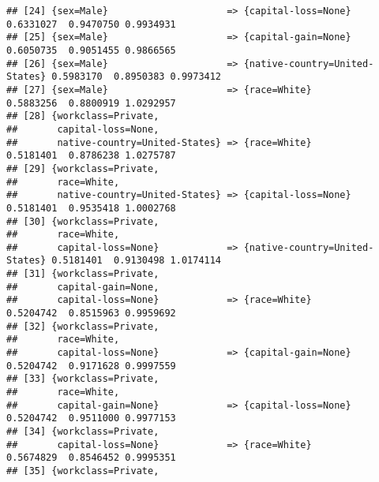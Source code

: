 \documentclass[]{article}
\begin{document}
\begin{verbatim}
## [24] {sex=Male}                     => {capital-loss=None}            0.6331027  0.9470750 0.9934931
## [25] {sex=Male}                     => {capital-gain=None}            0.6050735  0.9051455 0.9866565
## [26] {sex=Male}                     => {native-country=United-States} 0.5983170  0.8950383 0.9973412
## [27] {sex=Male}                     => {race=White}                   0.5883256  0.8800919 1.0292957
## [28] {workclass=Private,                                                                            
##       capital-loss=None,                                                                            
##       native-country=United-States} => {race=White}                   0.5181401  0.8786238 1.0275787
## [29] {workclass=Private,                                                                            
##       race=White,                                                                                   
##       native-country=United-States} => {capital-loss=None}            0.5181401  0.9535418 1.0002768
## [30] {workclass=Private,                                                                            
##       race=White,                                                                                   
##       capital-loss=None}            => {native-country=United-States} 0.5181401  0.9130498 1.0174114
## [31] {workclass=Private,                                                                            
##       capital-gain=None,                                                                            
##       capital-loss=None}            => {race=White}                   0.5204742  0.8515963 0.9959692
## [32] {workclass=Private,                                                                            
##       race=White,                                                                                   
##       capital-loss=None}            => {capital-gain=None}            0.5204742  0.9171628 0.9997559
## [33] {workclass=Private,                                                                            
##       race=White,                                                                                   
##       capital-gain=None}            => {capital-loss=None}            0.5204742  0.9511000 0.9977153
## [34] {workclass=Private,                                                                            
##       capital-loss=None}            => {race=White}                   0.5674829  0.8546452 0.9995351
## [35] {workclass=Private,                                                                            

\end{verbatim}
\end{document}
